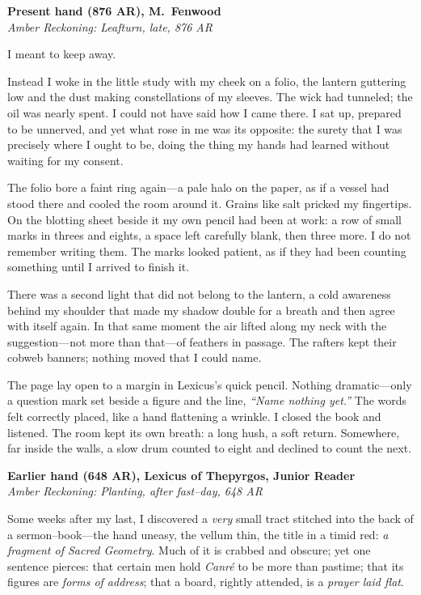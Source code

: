 \documentclass[11pt]{article}
\begin{document}
\medskip
\noindent\textbf{Present hand (876 AR), M.\ Fenwood}\\
\noindent\textit{Amber Reckoning: Leafturn, late, 876 AR}

I meant to keep away.

Instead I woke in the little study with my cheek on a folio, the lantern guttering low and the dust making constellations of my sleeves. The wick had tunneled; the oil was nearly spent. I could not have said how I came there. I sat up, prepared to be unnerved, and yet what rose in me was its opposite: the surety that I was precisely where I ought to be, doing the thing my hands had learned without waiting for my consent.

The folio bore a faint ring again—a pale halo on the paper, as if a vessel had stood there and cooled the room around it. Grains like salt pricked my fingertips. On the blotting sheet beside it my own pencil had been at work: a row of small marks in threes and eights, a space left carefully blank, then three more. I do not remember writing them. The marks looked patient, as if they had been counting something until I arrived to finish it.

There was a second light that did not belong to the lantern, a cold awareness behind my shoulder that made my shadow double for a breath and then agree with itself again. In that same moment the air lifted along my neck with the suggestion—not more than that—of feathers in passage. The rafters kept their cobweb banners; nothing moved that I could name.

The page lay open to a margin in Lexicus’s quick pencil. Nothing dramatic—only a question mark set beside a figure and the line, \emph{“Name nothing yet.”} The words felt correctly placed, like a hand flattening a wrinkle. I closed the book and listened. The room kept its own breath: a long hush, a soft return. Somewhere, far inside the walls, a slow drum counted to eight and declined to count the next.

\medskip
\noindent\textbf{Earlier hand (648 AR), Lexicus of Thepyrgos, Junior Reader}\\
\noindent\textit{Amber Reckoning: Planting, after fast–day, 648 AR}

Some weeks after my last, I discovered a \emph{very} small tract stitched into the back of a sermon–book—the hand uneasy, the vellum thin, the title in a timid red: \textit{a fragment of Sacred Geometry}. Much of it is crabbed and obscure; yet one sentence pierces: that certain men hold \textit{Canr\'e} to be more than pastime; that its figures are \emph{forms of address}; that a board, rightly attended, is a \emph{prayer laid flat}.
\end{document}
